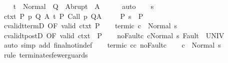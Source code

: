 \begin{isabellebody}
\ \ \isamarkupfalse%
\ {\isachardoublequoteopen}t\ {\isasymin}\ Normal\ {\isacharbackquote}\ Q\ {\isasymunion}\ Abrupt\ {\isacharbackquote}\ A{\isachardoublequoteclose}\isanewline
\ \ \ \ \isamarkupfalse%
\ auto\isanewline
{}\isamarkupfalse%
\isanewline
\ \ \isamarkupfalse%
\ s\ \isanewline
\ \ \isamarkupfalse%
\ ctxt{\isacharcolon}\ {\isachardoublequoteopen}{\isasymforall}{\isacharparenleft}P{\isacharcomma}\ p{\isacharcomma}\ Q{\isacharcomma}\ A{\isacharparenright}{\isasymin}{\isasymTheta}{\isachardot}\ {\isasymGamma}{\isasymTurnstile}\isactrlsub t\isactrlbsub {\isacharslash}{\isacharbraceleft}{\isacharbraceright}\isactrlesub \ P\ {\isacharparenleft}Call\ p{\isacharparenright}\ Q{\isacharcomma}A{\isachardoublequoteclose}\ \isanewline
\ \ \isamarkupfalse%
\ P{\isacharcolon}\ {\isachardoublequoteopen}s\ {\isasymin}\ P{\isachardoublequoteclose}\ \isanewline
\ \ \isamarkupfalse%
\ cvalidt{\isacharunderscore}termD\ {\isacharbrackleft}OF\ valid\ ctxt\ P{\isacharbrackright}\isanewline
\ \ \isamarkupfalse%
\ termi{\isacharunderscore}c{\isacharprime}{\isacharcolon}\ {\isachardoublequoteopen}{\isasymGamma}{\isasymturnstile}c{\isacharprime}\ {\isasymdown}\ Normal\ s{\isachardoublequoteclose}\isacommand{{\isachardot}}\isamarkupfalse%
\isanewline
\ \ \isamarkupfalse%
\ cvalidt{\isacharunderscore}postD\ {\isacharbrackleft}OF\ valid\ ctxt\ {\isacharunderscore}\ P{\isacharbrackright}\isanewline
\ \ \isamarkupfalse%
\ noFault{\isacharunderscore}c{\isacharprime}{\isacharcolon}\ {\isachardoublequoteopen}{\isasymGamma}{\isasymturnstile}{\isasymlangle}c{\isacharprime}{\isacharcomma}Normal\ s{\isasymrangle}\ {\isasymRightarrow}{\isasymnotin}Fault\ {\isacharbackquote}\ UNIV{\isachardoublequoteclose}\isanewline
\ \ \ \ \isamarkupfalse%
\ {\isacharparenleft}auto\ simp\ add{\isacharcolon}\ final{\isacharunderscore}notin{\isacharunderscore}def{\isacharparenright}\isanewline
\ \ \isamarkupfalse%
\ termi{\isacharunderscore}c{\isacharprime}\ c{\isacharunderscore}c{\isacharprime}\ noFault{\isacharunderscore}c{\isacharprime}\isanewline
\ \ \isamarkupfalse%
\ {\isachardoublequoteopen}{\isasymGamma}{\isasymturnstile}c\ {\isasymdown}\ Normal\ s{\isachardoublequoteclose}\isanewline
\ \ \ \ \isamarkupfalse%
\ {\isacharparenleft}rule\ terminates{\isacharunderscore}fewer{\isacharunderscore}guards{\isacharparenright}\isanewline
{}\isamarkupfalse%
%
\endisatagproof

\end{isabellebody}
